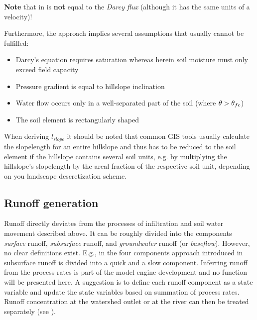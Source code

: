 \textbf{Note} that \latflow{} in  is \textbf{not} equal to the \emph{Darcy flux} (although it has the same units of a velocity)!

Furthermore, the approach implies several assumptions that usually cannot be fulfilled:

\begin{itemize}
\item Darcy's equation requires saturation whereas herein soil moisture must only exceed field capacity
\item Pressure gradient is equal to hillslope inclination
\item Water flow occurs only in a well-separated part of the soil (where $\theta > \theta_{fc}$)
\item The soil element is rectangularly shaped
\end{itemize}

When deriving $l_{slope}$ it should be noted that common GIS tools usually calculate the slopelength for an entire hillslope and thus has to be reduced to the soil element if the hillslope contains several soil units, e.g. by multiplying the hillslope's slopelength by the areal fraction of the respective soil unit, depending on you landscape descretization scheme.






\subsection{Runoff generation}
Runoff directly deviates from the processes of infiltration and soil water movement described above. It can be roughly divided into the components \emph{surface} runoff, \emph{subsurface} runoff, and \emph{groundwater} runoff (or \emph{baseflow}). However, no clear definitions exist. E.g., in the four components approach introduced in  subsurface runoff is divided into a quick and a slow component. Inferring runoff from the process rates is part of the model engine development and no function will be presented here. A suggestion is to define each runoff component as a state variable and update the state variables based on summation of process rates. Runoff concentration at the watershed outlet or at the river can then be treated separately (see ). 

